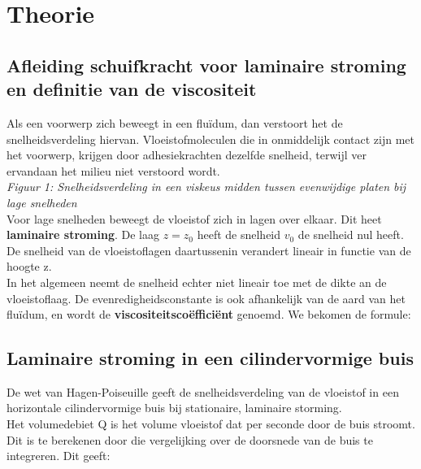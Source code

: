 \section{Theorie}

\subsection{Afleiding schuifkracht voor laminaire stroming en 
definitie van de viscositeit}

Als een voorwerp zich beweegt in een flu\"idum, dan verstoort het de snelheidsverdeling hiervan.
Vloeistofmoleculen die in onmiddelijk contact zijn met het voorwerp, krijgen door 
adhesiekrachten dezelfde snelheid, terwijl ver ervandaan het milieu niet verstoord wordt.\\

\textit{Figuur 1: Snelheidsverdeling in een viskeus midden tussen evenwijdige platen bij lage snelheden}\\

Voor lage snelheden beweegt de vloeistof zich in lagen over elkaar. Dit heet \textbf{laminaire stroming}.
De laag $z = z_{0}$ heeft de snelheid $v_{0}$ de snelheid nul heeft. De snelheid van de 
vloeistoflagen daartussenin verandert lineair in functie van de hoogte z.\\

In het algemeen neemt de snelheid echter niet lineair toe met de dikte an de vloeistoflaag. 
De evenredigheidsconstante is ook afhankelijk van de aard van het flu\"idum, en wordt de
\textbf{viscositeitsco\"effici\"ent} genoemd. We bekomen de formule:

\subsection{Laminaire stroming in een cilindervormige buis}

De wet van Hagen-Poiseuille geeft de snelheidsverdeling van de vloeistof 
in een horizontale cilindervormige buis bij stationaire, laminaire storming.\\

Het volumedebiet Q is het volume vloeistof dat per seconde door de buis stroomt.
Dit is te berekenen door die vergelijking over de doorsnede van de buis te integreren. 
Dit geeft: 

